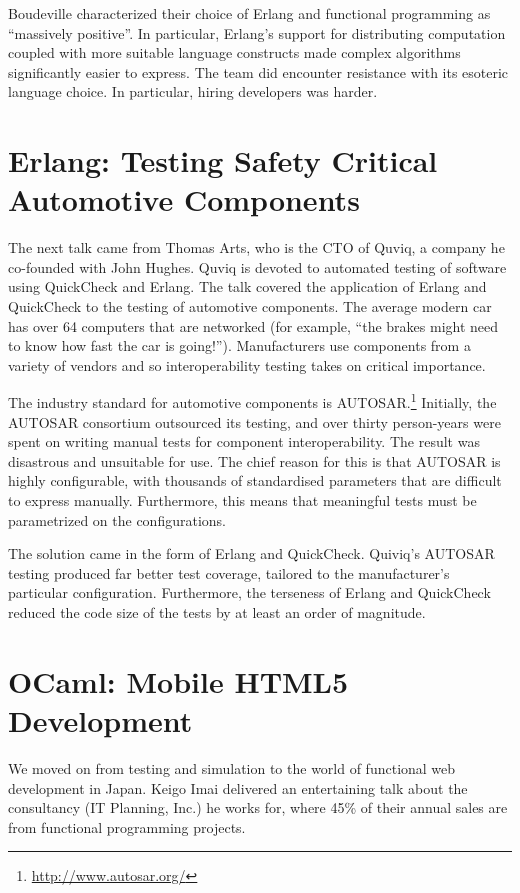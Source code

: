 \documentclass{jfp1}
\begin{document}
Boudeville characterized their choice of Erlang and functional programming as
``massively positive''.  In particular, Erlang's support for distributing
computation coupled with more suitable language constructs made complex
algorithms significantly easier to express.  The team did encounter resistance
with its esoteric language choice.  In particular, hiring developers was
harder.

\section{Erlang: Testing Safety Critical Automotive Components}

The next talk came from Thomas Arts, who is the CTO of Quviq, a company he co-founded with
John Hughes. Quviq is devoted to automated testing of software using
QuickCheck and Erlang.  The talk covered the application of Erlang and
QuickCheck to the testing of automotive components.  The average modern car has
over 64 computers that are networked (for example, ``the brakes might need to know how fast
the car is going!'').  Manufacturers use components from a variety of vendors
and so interoperability testing takes on critical importance.

The industry standard for automotive components is
AUTOSAR.\footnote{\url{http://www.autosar.org/}} Initially, the AUTOSAR
consortium outsourced its testing, and over thirty person-years were spent on
writing manual tests for component interoperability.  The result was disastrous
and unsuitable for use.  The chief reason for this is that AUTOSAR is highly
configurable, with thousands of standardised parameters that are difficult to
express manually.  Furthermore, this means that meaningful tests must be
parametrized on the configurations.

The solution came in the form of Erlang and QuickCheck.  Quiviq's AUTOSAR
testing produced far better test coverage, tailored to the manufacturer's
particular configuration.  Furthermore, the terseness of Erlang and QuickCheck
reduced the code size of the tests by at least an order of magnitude.

\section{OCaml: Mobile HTML5 Development}

We moved on from testing and simulation to the world of functional web
development in Japan. Keigo Imai delivered an entertaining talk about the
consultancy (IT Planning, Inc.) he works for, where 45\% of their annual sales are from
functional programming projects.
\end{document}
